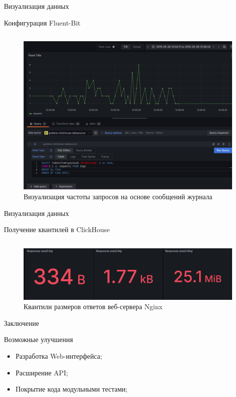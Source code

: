 \documentclass{beamer}
\begin{document}
\begin{frame}{Визуализация данных}
	\begin{listing}[H]
		\caption{Конфигурация Fluent-Bit}
		\inputminted[style=bw, frame=single,fontsize = \small, linenos=true, xleftmargin = 1.5em, breaklines=true]{sql}{./listings/grafana_nginx_requests.sql}
	\end{listing}

	\begin{figure}[H]
		\centering
		\includegraphics[width=.5\textwidth]{./imgs/nginx_grafana_requests.png}
		\caption{Визуализация частоты запросов на основе сообщений журнала}
	\end{figure}

\end{frame}

\begin{frame}{Визуализация данных}
	\begin{listing}[H]
		\caption{Получение квантилей в ClickHouse}
		\inputminted[style=bw, frame=single,fontsize = \small, linenos=true, xleftmargin = 1.5em, breaklines=true]{sql}{./listings/quantiles.sql}
	\end{listing}

	\begin{figure}[H]
		\centering
		\includegraphics[width=.7\textwidth]{./imgs/nginx_grafana_size_quantilie.png}
		\caption{Квантили размеров ответов веб-сервера Nginx}
	\end{figure}
\end{frame}


\begin{frame}{Заключение}
	\begin{alertblock}{Возможные улучшения}
		\begin{itemize}
			\item Разработка Web-интерфейса;
			\item Расширение API;
			\item Покрытие кода модульными тестами;
		\end{itemize}
	\end{alertblock}
\end{frame}
\end{document}
